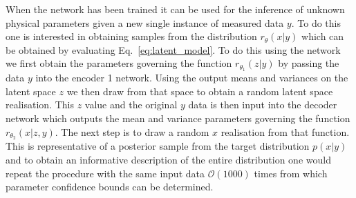 \documentclass[%
showpacs,
 amsmath,amssymb,
 aps,
 twocolumn,
 prl,
 reprint,
floatfix,
]{revtex4-1}
\begin{document}
When the network has been trained it can be used for the inference of unknown
physical parameters given a new single instance of measured data $y$. To do
this one is interested in obtaining samples from the distribution
$r_{\theta}(x|y)$ which can be obtained by evaluating
Eq.~\ref{eq:latent_model}. To do this using the network we first obtain the
parameters governing the function $r_{\theta_{1}}(z|y)$ by passing the data $y$
into the encoder 1 network. Using the output means and variances on the latent space
$z$ we then draw from that space to obtain a random latent space realisation.
This $z$ value and the original $y$ data is then input into the decoder network
which outputs the mean and variance parameters governing the function
$r_{\theta_{2}}(x|z,y)$. The next step is to draw a random $x$ realisation from
that function. This is representative of a posterior sample from the target
distribution $p(x|y)$ and to obtain an informative description of the entire
distribution one would repeat the procedure with the same input data
$\mathcal{O}(1000)$ times from which parameter confidence bounds can be
determined.      



\end{document}
